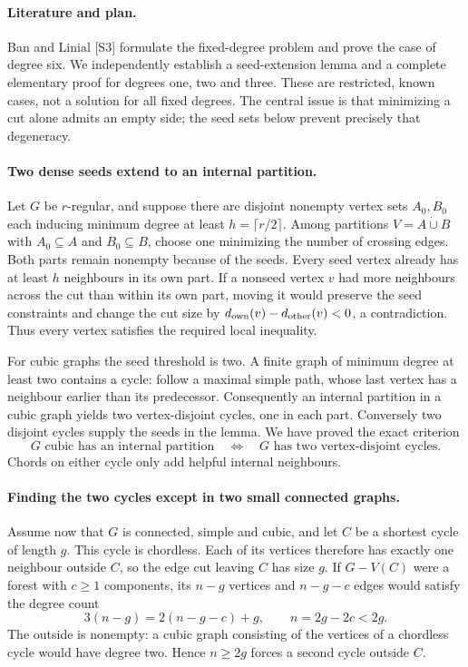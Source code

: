 \documentclass[11pt,a4paper]{article}
\begin{document}
\paragraph{Literature and plan.}
Ban and Linial [S3] formulate the fixed-degree problem and prove the
case of degree six. We independently establish a seed-extension lemma
and a complete elementary proof for degrees one, two and three. These
are restricted, known cases, not a solution for all fixed degrees.
The central issue is that minimizing a cut alone admits an empty side;
the seed sets below prevent precisely that degeneracy.

\paragraph{Two dense seeds extend to an internal partition.}
Let $G$ be $r$-regular, and suppose there are disjoint nonempty vertex
sets $A_0,B_0$ each inducing minimum degree at least
$h=\lceil r/2\rceil$. Among partitions $V=A\mathbin{\dot\cup}B$
with $A_0\subseteq A$ and $B_0\subseteq B$, choose one minimizing
the number of crossing edges. Both parts remain nonempty because
of the seeds. Every seed vertex already has at least $h$ neighbours
in its own part. If a nonseed vertex $v$ had more neighbours across
the cut than within its own part, moving it would preserve the seed
constraints and change the cut size by
$d_{\rm own}(v)-d_{\rm other}(v)<0$, a contradiction.
Thus every vertex satisfies the required local inequality.

For cubic graphs the seed threshold is two. A finite graph of minimum
degree at least two contains a cycle: follow a maximal simple path,
whose last vertex has a neighbour earlier than its predecessor.
Consequently an internal partition in a cubic graph yields two
vertex-disjoint cycles, one in each part. Conversely two disjoint
cycles supply the seeds in the lemma. We have proved the exact criterion
\[
 G\text{ cubic has an internal partition}
 \quad\Longleftrightarrow\quad
 G\text{ has two vertex-disjoint cycles}.
\]
Chords on either cycle only add helpful internal neighbours.

\paragraph{Finding the two cycles except in two small connected graphs.}
Assume now that $G$ is connected, simple and cubic, and let $C$ be
a shortest cycle of length $g$. This cycle is chordless. Each of
its vertices therefore has exactly one neighbour outside $C$, so
the edge cut leaving $C$ has size $g$. If $G-V(C)$ were a forest
with $c\ge1$ components, its $n-g$ vertices and $n-g-c$ edges would
satisfy the degree count
\[
 3(n-g)=2(n-g-c)+g,\qquad n=2g-2c<2g.
\]
The outside is nonempty: a cubic graph consisting of the vertices
of a chordless cycle would have degree two. Hence $n\ge2g$ forces
a second cycle outside $C$.
\end{document}
